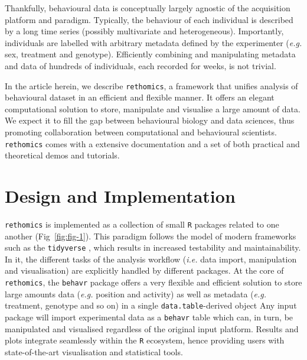 \documentclass[10pt,letterpaper]{article}\usepackage[]{graphicx}\usepackage[]{color}
\begin{document}
Thankfully, behavioural data is conceptually largely agnostic of the acquisition platform and paradigm. 	
Typically, the behaviour of each individual is described by a long time series (possibly multivariate and heterogeneous).
Importantly, individuals are labelled with arbitrary metadata defined by the experimenter (\emph{e.g.} sex, treatment and genotype).
Efficiently combining and manipulating metadata and data of hundreds of individuals, each recorded for weeks, is not trivial.

In the article herein, we describe \texttt{rethomics}, a framework that unifies analysis of behavioural dataset in an efficient and flexible manner.
It offers an elegant computational solution to store, manipulate and visualise a large amount of data.
We expect it to fill the gap between behavioural biology and data sciences, thus promoting collaboration between computational and behavioural scientists.
\texttt{rethomics} comes with a extensive documentation and a set of both practical and theoretical demos and tutorials.


\section*{Design and Implementation}

\texttt{rethomics} is implemented as a collection of small \texttt{R}\cite{r_core_team_r:_2017} packages related to one another (Fig~\ref{fig:fig-1}).
This paradigm follows the model of modern frameworks such as the \texttt{tidyverse} \cite{wickham_tidyverse:_2017}, which results in increased testability and maintainability.
In it, the different tasks of the analysis workflow (\emph{i.e.} data import, manipulation and visualisation)
are explicitly handled by different packages.
At the core of \texttt{rethomics}, the \texttt{behavr} package offers a very flexible and efficient solution to store large amounts data (\emph{e.g.} position and activity) as well as metadata (\emph{e.g.} treatment, genotype and so on) in a single \texttt{data.table}-derived object\cite{dowle_data.table:_2017}
Any input package will import experimental data as a \texttt{behavr} table which can, in turn, be manipulated and visualised regardless of the original input platform.
Results and plots integrate seamlessly within the \texttt{R} ecosystem, hence providing users with state-of-the-art visualisation and statistical tools.

\end{document}
